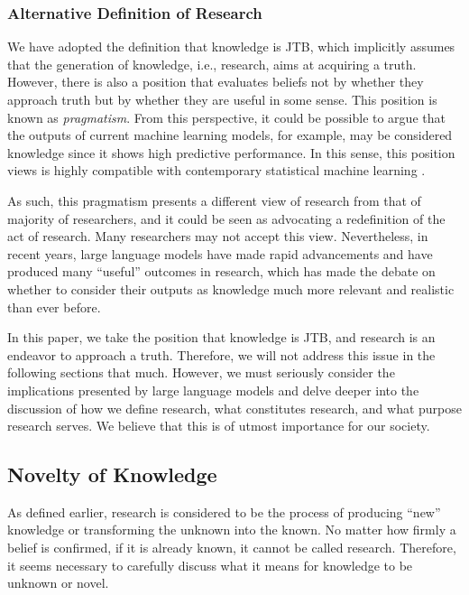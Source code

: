 \subsubsection{Alternative Definition of Research}
We have adopted the definition that knowledge is JTB, which implicitly assumes that the generation of knowledge, i.e., research, aims at acquiring a truth. However, there is also a position that evaluates beliefs not by whether they approach truth but by whether they are useful in some sense. This position is known as \textit{pragmatism}. From this perspective, it could be possible to argue that the outputs of current machine learning models, for example, may be considered knowledge since it shows high predictive performance. In this sense, this position views is highly compatible with contemporary statistical machine learning \cite{otsuka2022thinking}.

As such, this pragmatism presents a different view of research from that of majority of researchers, and it could be seen as advocating a redefinition of the act of research. Many researchers may not accept this view. Nevertheless, in recent years, large language models have made rapid advancements and have produced many ``useful'' outcomes in research, which has made the debate on whether to consider their outputs as knowledge much more relevant and realistic than ever before.

In this paper, we take the position that knowledge is JTB, and research is an endeavor to approach a truth. Therefore, we will not address this issue in the following sections that much. However, we must seriously consider the implications presented by large language models and delve deeper into the discussion of how we define research, what constitutes research, and what purpose research serves. We believe that this is of utmost importance for our society.

\subsection{Novelty of Knowledge}
As defined earlier, research is considered to be the process of producing ``new'' knowledge or transforming the unknown into the known. No matter how firmly a belief is confirmed, if it is already known, it cannot be called research. Therefore, it seems necessary to carefully discuss what it means for knowledge to be unknown or novel.


